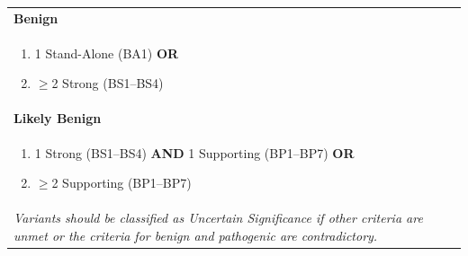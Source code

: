 \documentclass[../main.tex]{subfiles}
\begin{document}
\begin{table}[h!]
\begin{tabular}{p{}}
\textbf{Benign} \\
\begin{enumerate}[label=\arabic*., wide, labelindent=0pt, topsep=2pt, itemsep=1pt]
    \item 1 Stand-Alone (BA1) \textbf{OR}
    \item $\ge$2 Strong (BS1--BS4)
\end{enumerate}
\vspace{0.5em} \\
\midrule

\textbf{Likely Benign} \\
\begin{enumerate}[label=\arabic*., wide, labelindent=0pt, topsep=2pt, itemsep=1pt]
    \item 1 Strong (BS1--BS4) \textbf{AND} 1 Supporting (BP1--BP7) \textbf{OR}
    \item $\ge$2 Supporting (BP1--BP7)
\end{enumerate}
\vspace{0.5em} \\
\midrule
\multicolumn{1}{p{0.95\textwidth}}{\textit{Variants should be classified as Uncertain Significance if other criteria are unmet or the criteria for benign and pathogenic are contradictory.}} \\
\bottomrule
\end{tabular}
\end{table}
\end{document}
